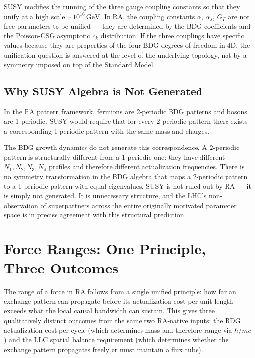 \documentclass[11pt,a4paper]{article}
\begin{document}
SUSY modifies the running of the three gauge coupling constants so that they
unify at a high scale $\sim 10^{16}~\text{GeV}$. In RA, the coupling constants
$\alpha$, $\alpha_s$, $G_F$ are not free parameters to be unified --- they are
determined by the BDG coefficients and the Poisson-CSG asymptotic $c_k$
distribution. If the three couplings have specific values because they are
properties of the four BDG degrees of freedom in 4D, the unification question
is answered at the level of the underlying topology, not by a symmetry imposed
on top of the Standard Model.

\subsection{Why SUSY Algebra is Not Generated}

In the RA pattern framework, fermions are 2-periodic BDG patterns and bosons
are 1-periodic. SUSY would require that for every 2-periodic pattern there
exists a corresponding 1-periodic pattern with the same mass and charges.

The BDG growth dynamics do not generate this correspondence. A 2-periodic
pattern is structurally different from a 1-periodic one: they have different
$N_1, N_2, N_3, N_4$ profiles and therefore different actualization
frequencies. There is no symmetry transformation in the BDG algebra that
maps a 2-periodic pattern to a 1-periodic pattern with equal eigenvalues.
SUSY is not ruled out by RA --- it is simply not generated. It is unnecessary
structure, and the LHC's non-observation of superpartners across the entire
originally motivated parameter space is in precise agreement with this
structural prediction.

\section{Force Ranges: One Principle, Three Outcomes}
\label{sec:ranges}

The range of a force in RA follows from a single unified principle: how far
an exchange pattern can propagate before its actualization cost per unit
length exceeds what the local causal bandwidth can sustain. This gives three
qualitatively distinct outcomes from the same two RA-native inputs: the BDG
actualization cost per cycle (which determines mass and therefore range via
$\hbar/mc$) and the LLC spatial balance requirement (which determines whether
the exchange pattern propagates freely or must maintain a flux tube).
\end{document}
